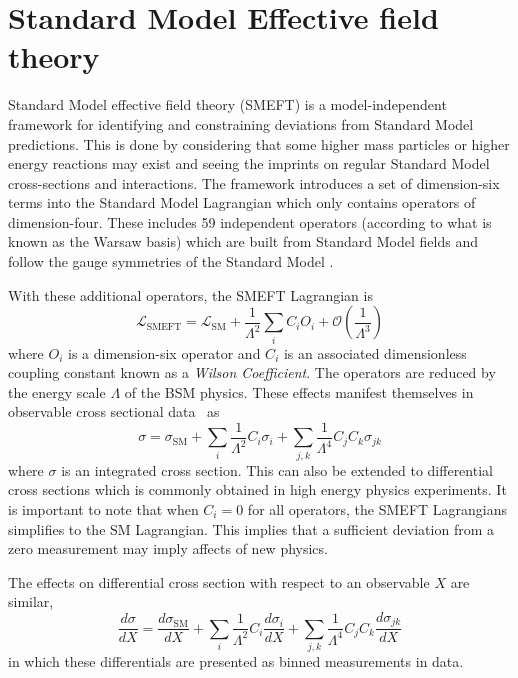 \documentclass[a4paper,11pt]{article}
\begin{document}
\section{Standard Model Effective field theory}

\nocite{Zhang2011}
\nocite{franzosi2015probing}

Standard Model effective field theory (SMEFT) is a model-independent framework for identifying and constraining deviations from Standard Model predictions.
This is done by considering that some higher mass particles or higher energy reactions may exist and seeing the imprints on regular Standard Model cross-sections and interactions.
The framework introduces a set of dimension-six terms into the Standard Model Lagrangian which only contains operators of dimension-four.
These includes 59 independent operators (according to what is known as the Warsaw basis) which are built from Standard Model fields and follow the gauge symmetries of the Standard Model \cite{Grzadkowski_2010}.

With these additional operators, the SMEFT Lagrangian is
\begin{equation}\label{eq:smeft_lagrangian}
    \mathcal{L}_{\text{SMEFT}} = \mathcal{L}_{\text{SM}} + \frac{1}{\Lambda^2} \sum\limits_{i} C_{i} O_{i} + \mathcal{O}\left(\frac{1}{\Lambda^3}\right)
\end{equation}
where $O_{i}$ is a dimension-six operator and $C_{i}$ is an associated dimensionless coupling constant known as a \emph{Wilson Coefficient}.
The operators are reduced by the energy scale $\Lambda$ of the BSM physics.
These effects manifest themselves in observable cross sectional data~\cite{Hartland_2019} as
\begin{equation}\label{eq:smeft_cross_section}
    \sigma = \sigma_{\text{SM}} + \sum\limits_{i} \frac{1}{\Lambda^2} C_{i} \sigma_{i} + \sum\limits_{j,k} \frac{1}{\Lambda^4} C_{j} C_{k} \sigma_{j k}
\end{equation}
where $\sigma$ is an integrated cross section. This can also be extended to differential cross sections which is commonly obtained in high energy physics experiments.
It is important to note that when $C_{i}=0$ for all operators, the SMEFT Lagrangians simplifies to the SM Lagrangian.
This implies that a sufficient deviation from a zero measurement may imply affects of new physics.

The effects on differential cross section with respect to an observable $X$ are similar,
\begin{equation}\label{eq:smeft_diff_cross_section}
    \frac{d\sigma}{dX} = \frac{d\sigma_{\text{SM}}}{dX} + \sum\limits_{i} \frac{1}{\Lambda^2} C_{i} \frac{d\sigma_{i}}{dX} + \sum\limits_{j,k} \frac{1}{\Lambda^4} C_{j} C_{k} \frac{d\sigma_{j k}}{dX}
\end{equation}
in which these differentials are presented as binned measurements in data.
\end{document}
